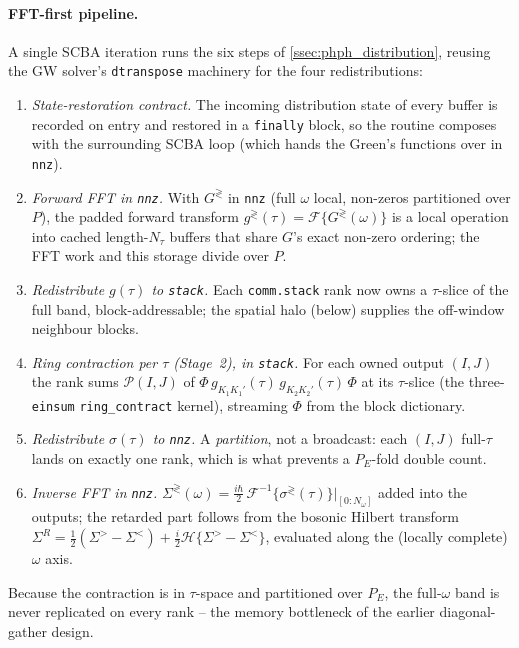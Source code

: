 \paragraph{FFT-first pipeline.} A single SCBA iteration runs the
six steps of \cref{ssec:phph_distribution}, reusing the GW
solver's \texttt{dtranspose} machinery
\cite{vetsch_ab-initio_2025} for the four redistributions:
\begin{enumerate}[label=(\roman*)]
  \item \emph{State-restoration contract.} The incoming
        distribution state of every buffer is recorded on entry and
        restored in a \texttt{finally} block, so the routine
        composes with the surrounding SCBA loop (which hands the
        Green's functions over in \texttt{nnz}).
  \item \emph{Forward FFT in \texttt{nnz}.} With $G^{\gtrless}$ in
        \texttt{nnz} (full $\omega$ local, non-zeros partitioned
        over $P$), the padded forward transform
        $g^{\gtrless}(\tau)=\mathcal{F}\{G^{\gtrless}(\omega)\}$ is
        a local operation into cached length-$N_\tau$ buffers that
        share $G$'s exact non-zero ordering; the FFT work and this
        storage divide over $P$.
  \item \emph{Redistribute $g(\tau)$ to \texttt{stack}.} Each
        \texttt{comm.stack} rank now owns a $\tau$-slice of the full
        band, block-addressable; the spatial halo (below) supplies
        the off-window neighbour blocks.
  \item \emph{Ring contraction per $\tau$ (Stage~2), in
        \texttt{stack}.} For each owned output $(I,J)$ the rank sums
        $\mathcal{P}(I,J)$ of
        $\Phi\,g_{K_1K_1'}(\tau)\,g_{K_2K_2'}(\tau)\,\Phi$ at its
        $\tau$-slice (the three-\texttt{einsum} \texttt{ring\_contract}
        kernel), streaming $\Phi$ from the block dictionary.
  \item \emph{Redistribute $\sigma(\tau)$ to \texttt{nnz}.} A
        \emph{partition}, not a broadcast: each $(I,J)$ full-$\tau$
        lands on exactly one rank, which is what prevents a
        $P_E$-fold double count.
  \item \emph{Inverse FFT in \texttt{nnz}.}
        $\Sigma^{\gtrless}(\omega)=\tfrac{i\hbar}{2}\,
        \mathcal{F}^{-1}\{\sigma^{\gtrless}(\tau)\}|_{[0:N_\omega]}$
        added into the outputs; the retarded part follows from the
        bosonic Hilbert transform
        $\Sigma^R=\tfrac{1}{2}(\Sigma^>{-}\Sigma^<)
        +\tfrac{i}{2}\mathcal{H}\{\Sigma^>{-}\Sigma^<\}$, evaluated
        along the (locally complete) $\omega$ axis.
\end{enumerate}
Because the contraction is in $\tau$-space and partitioned over
$P_E$, the full-$\omega$ band is never replicated on every rank --
the memory bottleneck of the earlier diagonal-gather design.

